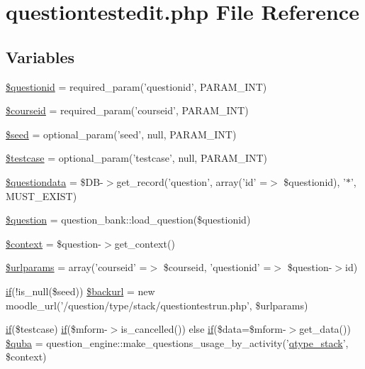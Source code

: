 \hypertarget{questiontestedit_8php}{
\section{questiontestedit.php File Reference}
\label{questiontestedit_8php}
}
\subsection*{Variables}
\begin{DoxyCompactItemize}
\item 
\hyperlink{questiontestedit_8php_a0b8a9e6194c5b1ca51e0f19a198c19d8}{\$questionid} = required\_\-param('questionid', PARAM\_\-INT)
\item 
\hyperlink{questiontestedit_8php_a2a1b481ca3e5ae5c2d7a66d271302f23}{\$courseid} = required\_\-param('courseid', PARAM\_\-INT)
\item 
\hyperlink{questiontestedit_8php_a4aea6700edf05cf13c65dc0e758c9ad3}{\$seed} = optional\_\-param('seed', null, PARAM\_\-INT)
\item 
\hyperlink{questiontestedit_8php_ae640ef9490b2598569406e3654f480b6}{\$testcase} = optional\_\-param('testcase', null, PARAM\_\-INT)
\item 
\hyperlink{questiontestedit_8php_ab3dbd2b3f38fc871b3aba59ed0657c55}{\$questiondata} = \$DB-\/$>$get\_\-record('question', array('id' =$>$ \$questionid), '$\ast$', MUST\_\-EXIST)
\item 
\hyperlink{questiontestedit_8php_acf0d1ba8b3999333306bf1a4fd363e93}{\$question} = question\_\-bank::load\_\-question(\$questionid)
\item 
\hyperlink{questiontestedit_8php_ae05dedb802ada0155efdece2044fed64}{\$context} = \$question-\/$>$get\_\-context()
\item 
\hyperlink{questiontestedit_8php_a1aa950c4029aca228dd33a4b27109e00}{\$urlparams} = array('courseid' =$>$ \$courseid, 'questionid' =$>$ \$question-\/$>$id)
\item 
\hyperlink{caschat_8php_a2018ad56dfaea89ba7f32f4f912be98f}{if}(!is\_\-null(\$seed)) \hyperlink{questiontestedit_8php_a28d8c96a7ddca2daae7a03f1567d1c3a}{\$backurl} = new moodle\_\-url('/question/type/stack/questiontestrun.php', \$urlparams)
\item 
\hyperlink{caschat_8php_a2018ad56dfaea89ba7f32f4f912be98f}{if}(\$testcase) \hyperlink{caschat_8php_a2018ad56dfaea89ba7f32f4f912be98f}{if}(\$mform-\/$>$is\_\-cancelled()) else \hyperlink{caschat_8php_a2018ad56dfaea89ba7f32f4f912be98f}{if}(\$data=\$mform-\/$>$get\_\-data()) \hyperlink{questiontestedit_8php_a428cf78a4e358b21d9f845e0ce3d592c}{\$quba} = question\_\-engine::make\_\-questions\_\-usage\_\-by\_\-activity('\hyperlink{classqtype__stack}{qtype\_\-stack}', \$context)

\end{DoxyCompactItemize}
